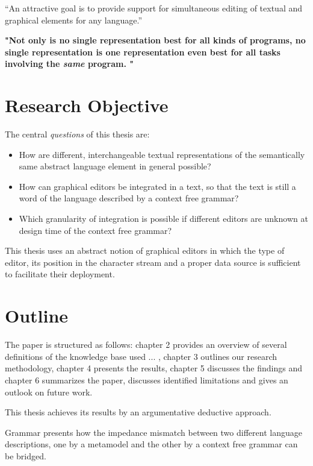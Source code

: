 
``An attractive goal is to provide support for simultaneous editing of textual and graphical elements for any language.''\cite{EMP}


\textbf{
"Not only is no single representation best for all kinds of programs, no single representation is one representation even best for all tasks involving the \emph{same}  program. " \cite{Petri} }



\section{Research Objective}
The central \emph{questions} of this thesis are:
\begin{itemize}
	\item How are different, interchangeable textual representations of the semantically same abstract language element in general possible?
	\item How can graphical editors be integrated in a text, so that the text is still a word of the language described by a context free grammar?
	\item Which granularity of integration is possible if different editors are unknown at design time of the context free grammar?
\end{itemize}

This thesis uses an abstract notion of graphical editors in which the type of editor, its position in the character stream and a proper data source is sufficient to facilitate their deployment.




\section{Outline}
The paper is structured as follows: chapter 2 provides an overview of several definitions of the knowledge base used ... , chapter 3 outlines our research methodology, chapter 4 presents the results, chapter 5 discusses the findings and chapter 6 summarizes the paper, discusses identified limitations and gives an outlook on future work.

This thesis achieves its results by an argumentative deductive approach. 

Grammar presents how the impedance mismatch between two different language descriptions, one by a metamodel and the other by a context free grammar can be bridged. 

